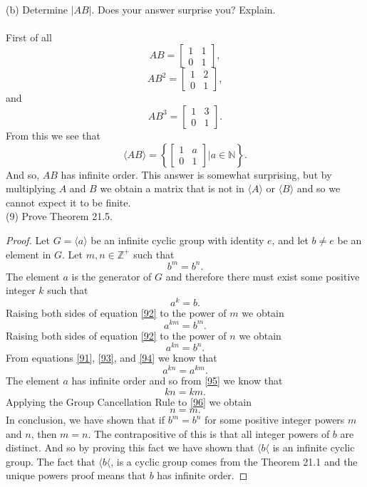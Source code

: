 \documentclass[11pt,a4paper]{article}
\begin{document}
~\\
(b) Determine $|AB|$. Does your answer surprise you? Explain.\\
~\\
First of all 
\[AB = \begin{bmatrix}1&1\\0&1\end{bmatrix}, \]
\[AB^2 = \begin{bmatrix}1&2\\0&1\end{bmatrix},\]
and
\[AB^3 = \begin{bmatrix}1&3\\0&1\end{bmatrix}.\]
From this we see that \[\langle AB \rangle = \left\{ \begin{bmatrix}1&a\\0&1\end{bmatrix} | a \in \mathbb{N}   \right\}.\]
And so, $AB$ has infinite order. This answer is somewhat surprising, but by multiplying $A$ and $B$ we obtain a matrix that is not in $\langle A \rangle$ or $\langle B \rangle$ and so we cannot expect it to be finite.
~\\
(9) Prove Theorem 21.5.
\begin{proof}
Let $G = \langle a \rangle$ be an infinite cyclic group with identity $e$, and let $b \neq e$ be an element in $G$. Let $m,n\in \mathbb{Z}^+$ such that 
\begin{equation}\label{91}
b^m = b^n.
\end{equation}
The element $a$ is the generator of $G$ and therefore there must exist some positive integer $k$ such that 
\begin{equation}\label{92}
a^k = b.
\end{equation}
Raising both sides of equation \eqref{92} to the power of $m$ we obtain
\begin{equation}\label{93}
a^{km} = b^m.
\end{equation}
Raising both sides of equation \eqref{92} to the power of $n$ we obtain
\begin{equation}\label{94}
a^{kn} = b^n.
\end{equation}
From equations \eqref{91}, \eqref{93}, and \eqref{94} we know that
\begin{equation}\label{95}
a^{kn} = a^{km}.
\end{equation}
The element $a$ has infinite order and so from \eqref{95} we know that
\begin{equation}\label{96}
kn = km.
\end{equation}
Applying the Group Cancellation Rule to \eqref{96} we obtain
\[n = m.\]
In conclusion, we have shown that if $b^m = b^n$ for some positive integer powers $m$ and $n$, then $m = n$. The contrapositive of this is that all integer powers of $b$ are distinct. And so by proving this fact we have shown that $\langle b \langle$ is an infinite cyclic group. The fact that $\langle b \langle$, is a cyclic group comes from the Theorem 21.1 and the unique powers proof means that $b$ has infinite order.
\end{proof}
\end{document}
